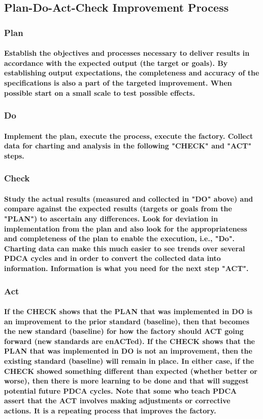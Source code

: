 \documentclass{acm_proc_article-sp}
\begin{document}
\subsection{Plan-Do-Act-Check Improvement Process}
\subsubsection{Plan}
\paragraph{Establish the objectives and processes necessary to deliver results in accordance with the expected output (the target or goals). By establishing output expectations, the completeness and accuracy of the specifications is also a part of the targeted improvement. When possible start on a small scale to test possible effects.}
\subsubsection{Do}
\paragraph{Implement the plan, execute the process, execute the factory. Collect data for charting and analysis in the following "CHECK" and "ACT" steps.}
\subsubsection{Check}
\paragraph{Study the actual results (measured and collected in "DO" above) and compare against the expected results (targets or goals from the "PLAN") to ascertain any differences. Look for deviation in implementation from the plan and also look for the appropriateness and completeness of the plan to enable the execution, i.e., "Do". Charting data can make this much easier to see trends over several PDCA cycles and in order to convert the collected data into information. Information is what you need for the next step "ACT".}
\subsubsection{Act}
\paragraph{If the CHECK shows that the PLAN that was implemented in DO is an improvement to the prior standard (baseline), then that becomes the new standard (baseline) for how the factory should ACT going forward (new standards are enACTed). If the CHECK shows that the PLAN that was implemented in DO is not an improvement, then the existing standard (baseline) will remain in place. In either case, if the CHECK showed something different than expected (whether better or worse), then there is more learning to be done and that will suggest potential future PDCA cycles. Note that some who teach PDCA assert that the ACT involves making adjustments or corrective actions. It is a repeating process that improves the factory.}
\end{document}
